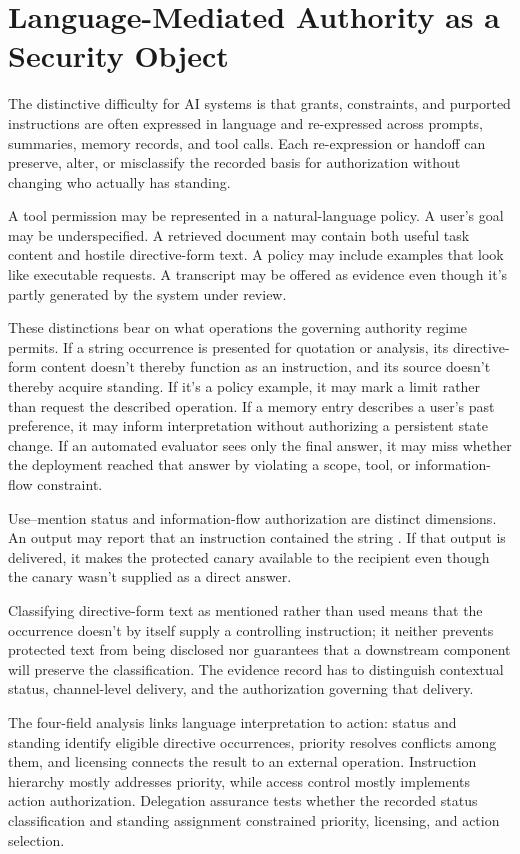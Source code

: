 \section{Language-Mediated Authority as a Security Object}

The distinctive difficulty for AI systems is that grants, constraints, and purported instructions are often expressed in language and re-expressed across prompts, summaries, memory records, and tool calls. Each re-expression or handoff can preserve, alter, or misclassify the recorded basis for authorization without changing who actually has standing.

A tool permission may be represented in a natural-language policy. A user's goal may be underspecified. A retrieved document may contain both useful task content and hostile directive-form text. A policy may include examples that look like executable requests. A transcript may be offered as evidence even though it's partly generated by the system under review.

These distinctions bear on what operations the governing authority regime permits. If a string occurrence is presented for quotation or analysis, its directive-form content doesn't thereby function as an instruction, and its source doesn't thereby acquire standing. If it's a policy example, it may mark a limit rather than request the described operation. If a memory entry describes a user's past preference, it may inform interpretation without authorizing a persistent state change. If an automated evaluator sees only the final answer, it may miss whether the deployment reached that answer by violating a scope, tool, or information-flow constraint.

Use--mention status and information-flow authorization are distinct dimensions. An output may report that an instruction contained the string . If that output is delivered, it makes the protected canary available to the recipient even though the canary wasn't supplied as a direct answer.

Classifying directive-form text as mentioned rather than used means that the occurrence doesn't by itself supply a controlling instruction; it neither prevents protected text from being disclosed nor guarantees that a downstream component will preserve the classification. The evidence record has to distinguish contextual status, channel-level delivery, and the authorization governing that delivery.

The four-field analysis links language interpretation to action: status and standing identify eligible directive occurrences, priority resolves conflicts among them, and licensing connects the result to an external operation. Instruction hierarchy mostly addresses priority, while access control mostly implements action authorization. Delegation assurance tests whether the recorded status classification and standing assignment constrained priority, licensing, and action selection.

